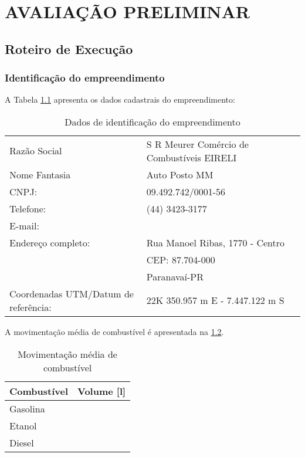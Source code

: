 \chapter{AVALIAÇÃO PRELIMINAR}

\section{Roteiro de Execução}

\subsection{Identificação do empreendimento}

A Tabela \ref{tab:ident} apresenta os dados cadastrais do 
empreendimento:

\begin{table}[htb!]
	\centering
	\caption{Dados de identificação do empreendimento}
	\label{tab:ident}
	\begin{tabularx}{\textwidth}{lp{}}
		\toprule
		Razão Social & S R Meurer Comércio de Combustíveis 
		EIRELI\\
		Nome Fantasia & Auto Posto MM\\
		CNPJ: & 09.492.742/0001-56\\
		Telefone: & (44) 3423-3177\\
		E-mail:& \\
		Endereço completo: & Rua Manoel Ribas, 1770 -  
		Centro\\
		&CEP: 87.704-000\\
		& Paranavaí-PR\\	
		Coordenadas UTM/Datum de referência: & 22K 
		350.957 m E - 7.447.122 m S\\
		\bottomrule
	\end{tabularx}
\end{table}


A movimentação média de combustível é apresentada na
\cref{tab:moviment}.

\begin{table}[htb!]
	\centering
	\caption{Movimentação média de combustível}
	\label{tab:moviment}
	\begin{tabular}{lc}
	\toprule
	\textbf{Combustível} & \textbf{Volume [l]}\\
	\midrule
	Gasolina & \\
	Etanol   & \\
	Diesel   &  \\
	\bottomrule
	\end{tabular}
\end{table}